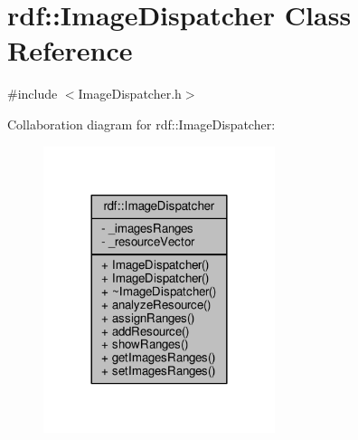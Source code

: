 \hypertarget{classrdf_1_1ImageDispatcher}{}\section{rdf\+:\+:Image\+Dispatcher Class Reference}
\label{classrdf_1_1ImageDispatcher}


{\ttfamily \#include $<$Image\+Dispatcher.\+h$>$}



Collaboration diagram for rdf\+:\+:Image\+Dispatcher\+:
\nopagebreak
\begin{figure}[H]
\begin{center}
\leavevmode
\includegraphics[width=192pt]{classrdf_1_1ImageDispatcher__coll__graph}
\end{center}
\end{figure}
